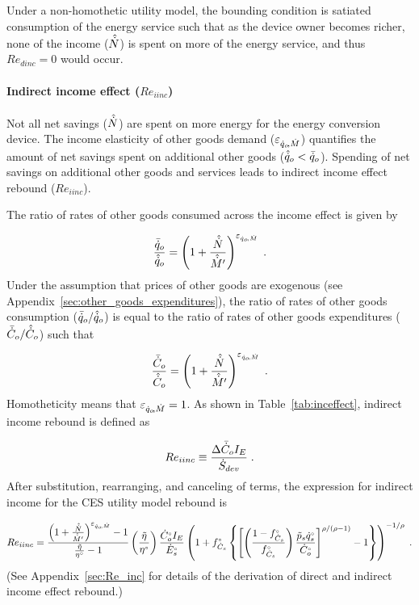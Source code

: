 \documentclass[12pt]{article}\usepackage[]{graphicx}\usepackage[]{xcolor}
\begin{document}
Under a non-homothetic utility model, 
the bounding condition is
satiated consumption of the energy service such that
as the device owner becomes richer, 
none of the income ($\hat{\dot{N}}$)
is spent on more of the energy service, and thus
$Re_{dinc} = 0$ would occur.


\paragraph{Indirect income effect ($Re_{iinc}$)} 
\label{sec:indirect_income_effect}

Not all net savings ($\hat{\dot{N}}$) are spent on more energy 
for the energy conversion device.
The income elasticity of other goods demand ($\varepsilon_{\dot{q}_o\!,\dot{M}}$)
quantifies the amount of net savings spent 
on additional other goods ($\hat{\dot{q}}_o < \bar{\dot{q}}_o$).
Spending of net savings on additional other goods and services
leads to indirect income effect rebound ($Re_{iinc}$).

The ratio of rates of other goods consumed across the income effect is given by

\begin{equation} \label{eq:qorat_eqoM}
  \frac{\bar{\dot{q}}_o}{\hat{\dot{q}}_o} = \left( 1 + \frac{\hat{\dot{N}}}{\hat{\dot{M}}^\prime} \right) ^{\varepsilon_{\dot{q}_o\!,\dot{M}}} \; .
\end{equation}
%
Under the assumption that prices of other goods are exogenous
(see Appendix~\ref{sec:other_goods_expenditures}), 
the ratio of rates of other goods consumption ($\bar{\dot{q}}_o/\hat{\dot{q}}_o$)
is equal to the ratio of rates of other goods expenditures ($\bar{\dot{C}}_o/\hat{\dot{C}}_o$)
such that 

\begin{equation} \label{eq:Corat_eqoM}
  \frac{\bar{\dot{C}}_o}{\hat{\dot{C}}_o} = \left( 1 + \frac{\hat{\dot{N}}}{\hat{\dot{M}}^\prime} \right)^{\varepsilon_{\dot{q}_o\!,\dot{M}}} \; .
\end{equation}
%
Homotheticity means that $\varepsilon_{\dot{q}_o\!,\dot{M}} = 1$.
As shown in Table~\ref{tab:inceffect}, indirect income rebound is defined as

\begin{equation} \label{eq:Re_iinc_def}
  Re_{iinc} \equiv \frac{\Delta \bar{\dot{C}}_o I_E}{\dot{S}_{dev}} \; .
\end{equation}
%
After substitution, rearranging, and canceling of terms, 
the expression for indirect income for the CES utility model rebound is

\begin{equation} \label{eq:Re_iinc}
  Re_{iinc} = \frac{\left( 1 + \frac{\hat{\dot{N}}}{\hat{\dot{M}}^\prime} \right)^{\varepsilon_{\dot{q}_o\!,\dot{M}}} - 1}{\frac{\tilde{\eta}}{{}{\eta}^{\scriptscriptstyle \circ}} - 1} \left( \frac{\tilde{\eta}}{{}{\eta}^{\scriptscriptstyle \circ}} \right) \frac{{}{\dot{C}}^{\scriptscriptstyle \circ}_o I_E}{{}{\dot{E}}^{\scriptscriptstyle \circ}_s} \left( 1 + {}{f}^{\scriptscriptstyle \circ}_{\dot{C}_s} \left\{ \left[ \left( \frac{1-{}{f}^{\scriptscriptstyle \circ}_{\dot{C}_s}}{{}{f}^{\scriptscriptstyle \circ}_{\dot{C}_s}} \right) \frac{\tilde{p}_s {}{\dot{q}}^{\scriptscriptstyle \circ}_s}{{}{\dot{C}}^{\scriptscriptstyle \circ}_o} \right] ^{\rho/(\rho - 1)} - 1 \right\} \right)^{-1/\rho}{}{} \; .
\end{equation}
%
(See Appendix~\ref{sec:Re_inc} for details of the derivation
of direct and indirect income effect rebound.)
\end{document}
